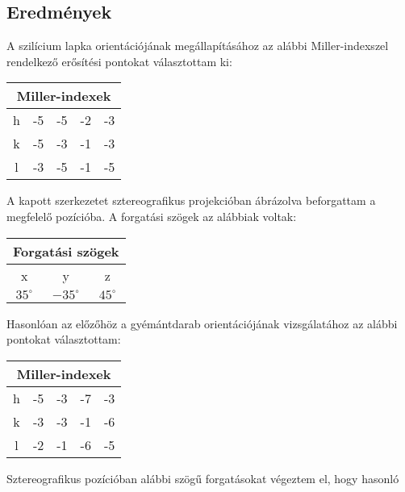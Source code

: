 \begin{multicols}{2}
\section{Eredmények}
A szilícium lapka orientációjának megállapításához az alábbi Miller-indexszel rendelkező erősítési pontokat választottam ki:

\begin{center}
\begin{tabular}{|c|c|c|c|c|}
\hline
\multicolumn{5}{|c|}{Miller-indexek} \\ \hline \hline
h & -5 & -5 & -2 & -3 \\
k & -5 & -3 & -1 & -3 \\
l & -3 & -5 & -1 & -5 \\
\hline
\end{tabular}
 \label{table:1}
\end{center}
A kapott szerkezetet sztereografikus projekcióban ábrázolva beforgattam a megfelelő pozícióba. A forgatási szögek az alábbiak voltak:

\begin{center}
\begin{tabular}{|c|c|c|}
\hline
\multicolumn{3}{|c|}{Forgatási szögek} \\ \hline \hline
x            & y             & z            \\ \hline
$35^{\circ}$ & $-35^{\circ}$ & $45^{\circ}$ \\
\hline
\end{tabular}
 \label{table:2}
\end{center}
Hasonlóan az előzőhöz a gyémántdarab orientációjának vizsgálatához az alábbi pontokat választottam:

\begin{center}
\begin{tabular}{|c|c|c|c|c|}
\hline
\multicolumn{5}{|c|}{Miller-indexek} \\ \hline \hline
h & -5 & -3 & -7 & -3 \\
k & -3 & -3 & -1 & -6 \\
l & -2 & -1 & -6 & -5 \\
\hline
\end{tabular}
 \label{table:3}
\end{center}
Sztereografikus pozícióban alábbi szögű forgatásokat végeztem el, hogy hasonló


\end{multicols}
